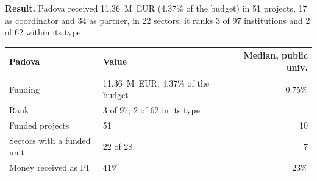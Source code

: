 \documentclass[11pt,a4paper]{article}
\begin{document}
\textbf{Result.} Padova received 11.36~M~EUR (4.37\% of the budget) in 51 projects, 17 as coordinator and 34 as partner, in 22 sectors; it ranks 3 of 97 institutions and 2 of 62 within its type.

\begin{table}[H]
\centering
\begin{tabular}{llr}
\toprule
Padova & Value & Median, public univ. \\
\midrule
Funding & 11.36~M~EUR, 4.37\% of the budget & 0.75\% \\
Rank & 3 of 97; 2 of 62 in its type &  \\
Funded projects & 51 & 10 \\
Sectors with a funded unit & 22 of 28 & 7 \\
Money received as PI & 41\% & 23\% \\
\bottomrule
\end{tabular}
\end{table}
\end{document}
